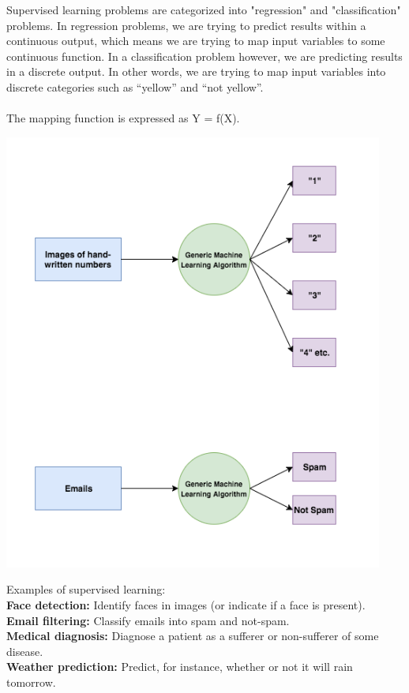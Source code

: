 \documentclass{42-en}
\begin{document}
Supervised learning problems are categorized into "regression" and "classification" problems. In regression problems, we are trying to predict results within a continuous output, which means we are trying to map input variables to some continuous function. In a classification problem however, we are predicting results in a discrete output. In other words, we are trying to map input variables into discrete categories such as “yellow” and “not yellow”.\\

\\

The mapping function is expressed as Y = f(X).\\

\centerline{\includegraphics[width=125mm]{images/sort_chart.png}}

Examples of supervised learning:\\
\textbf{Face detection:} Identify faces in images (or indicate if a face is present).\\
\textbf{Email filtering:} Classify emails into spam and not-spam.\\
\textbf{Medical diagnosis:} Diagnose a patient as a sufferer or non-sufferer of some disease.\\
\textbf{Weather prediction:} Predict, for instance, whether or not it will rain tomorrow.\\
\end{document}
